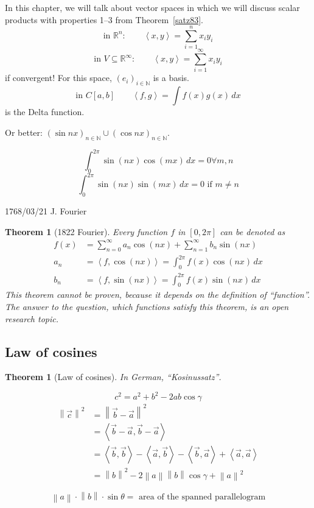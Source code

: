 \documentclass{article}
\newcounter{lecref}[section]
\numberwithin{lecref}{section}
\newtheorem{theorem}[lecref]{Theorem}
\newcommand{\angel}[1]{\left\langle#1\right\rangle}
\newcommand{\norm}[1]{\left\|#1\right\|}
\newcommand{\rh}[1]{\vec{#1}}
\begin{document}
In this chapter, we will talk about vector spaces in which we will discuss scalar products with properties 1--3 from Theorem~\ref{satz83}.
\[ \text{in } \mathbb R^n: \qquad \angel{x,y} = \sum_{i=1}^n x_i y_i \]
\[ \text{in } V \subseteq \mathbb R^\infty: \qquad \angel{x,y} = \sum_{i=1}^\infty x_i y_i \]
if convergent! For this space, $(e_i)_{i \in \mathbb N}$ is a basis.
\[ \text{in } C[a,b] \qquad \angel{f,g} = \int f(x) g(x) \, dx \]
is the Delta function.

Or better: $(\sin{nx})_{n \in \mathbb N} \cup (\cos{nx})_{n \in \mathbb N}$.

\[ \int_0^{2\pi} \sin(nx) \cos(mx) \, dx = 0 \forall m,n \]
\[ \int_0^{2\pi} \sin(nx) \sin(mx) \, dx = 0 \text{ if } m \neq n \]

1768/03/21 J. Fourier

\begin{theorem}[1822 Fourier]
  Every function $f$ in $[0,2\pi]$ can be denoted as
  \begin{align*}
    f(x) &= \sum_{n=0}^\infty a_n \cos(nx) + \sum_{n=1}^\infty b_n \sin(nx) \\
    a_n &= \angel{f, \cos(nx)} = \int_0^{2\pi} f(x) \cos(nx) \, dx \\
    b_n &= \angel{f, \sin(nx)} = \int_0^{2\pi} f(x) \sin(nx) \, dx
  \end{align*}
  This theorem cannot be proven, because it depends on the definition of \enquote{function}.
  The answer to the question, which functions satisfy this theorem, is an open research topic.
\end{theorem}

\subsection{Law of cosines}

\begin{theorem}[Law of cosines]
  In German, \foreignlanguage{german}{\enquote{Kosinussatz}}.

  \[ c^2 = a^2 + b^2 - 2ab \cos{\gamma} \]
  \begin{align*}
    \norm{\rh{c}}^2 &= \norm{\rh{b} - \rh{a}}^2 \\
      &= \angel{\rh{b} - \rh{a}, \rh{b} - \rh{a}} \\
      &= \angel{\rh{b}, \rh{b}} - \angel{\rh{a}, \rh{b}} - \angel{\rh{b}, \rh{a}} + \angel{\rh{a}, \rh{a}} \\
      &= \norm{b}^2 - 2 \norm{a} \norm{b} \cos\gamma + \norm{a}^2
  \end{align*}
\end{theorem}
\[ \norm a \cdot \norm b \cdot \sin\theta = \text{ area of the spanned parallelogram} \]
\end{document}
